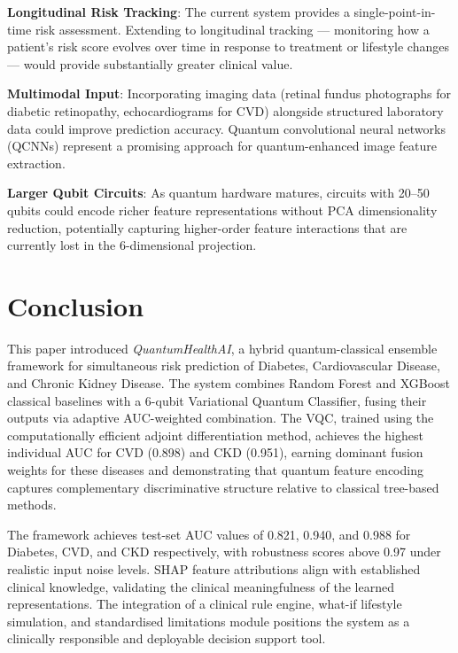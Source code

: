 ﻿\documentclass[conference]{IEEEtran}
\begin{document}
\textbf{Longitudinal Risk Tracking}: The current system provides a single-point-in-time
risk assessment. Extending to longitudinal tracking --- monitoring how a patient's risk
score evolves over time in response to treatment or lifestyle changes --- would provide
substantially greater clinical value.

\textbf{Multimodal Input}: Incorporating imaging data (retinal fundus photographs for
diabetic retinopathy, echocardiograms for CVD) alongside structured laboratory data
could improve prediction accuracy. Quantum convolutional neural networks (QCNNs)
\cite{cong2019qcnn} represent a promising approach for quantum-enhanced image feature
extraction.

\textbf{Larger Qubit Circuits}: As quantum hardware matures, circuits with 20--50 qubits
could encode richer feature representations without PCA dimensionality reduction,
potentially capturing higher-order feature interactions that are currently lost in the
6-dimensional projection.

\section{Conclusion}
\label{sec:conclusion}

This paper introduced \textit{QuantumHealthAI}, a hybrid quantum-classical ensemble
framework for simultaneous risk prediction of Diabetes, Cardiovascular Disease, and
Chronic Kidney Disease. The system combines Random Forest and XGBoost classical baselines
with a 6-qubit Variational Quantum Classifier, fusing their outputs via adaptive
AUC-weighted combination. The VQC, trained using the computationally efficient adjoint
differentiation method, achieves the highest individual AUC for CVD (0.898) and CKD
(0.951), earning dominant fusion weights for these diseases and demonstrating that
quantum feature encoding captures complementary discriminative structure relative to
classical tree-based methods.

The framework achieves test-set AUC values of 0.821, 0.940, and 0.988 for Diabetes, CVD,
and CKD respectively, with robustness scores above 0.97 under realistic input noise
levels. SHAP feature attributions align with established clinical knowledge, validating
the clinical meaningfulness of the learned representations. The integration of a clinical
rule engine, what-if lifestyle simulation, and standardised limitations module positions
the system as a clinically responsible and deployable decision support tool.
\end{document}
